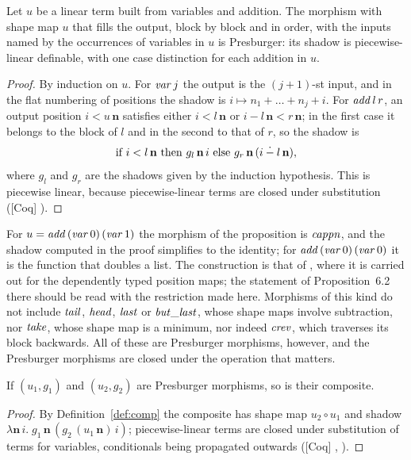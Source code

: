 \documentclass{fundam}
\begin{document}
\begin{proposition}\label{prop:linear-pl}
  Let $u$ be a linear term built from variables and addition.  The morphism with shape
  map $u$ that fills the output, block by block and in order, with the inputs named by
  the occurrences of variables in $u$ is Presburger: its shadow is piecewise-linear
  definable, with one case distinction for each addition in $u$.
\end{proposition}

\begin{proof}
  By induction on $u$.  For $\mathit{var}\,j$ the output is the $(j+1)$-st input, and in the
  flat numbering of positions the shadow is $i \mapsto n_1 + \dots + n_j + i$.  For
  $\mathit{add}\,l\,r$, an output position $i < u\,\mathbf{n}$ satisfies either
  $i < l\,\mathbf{n}$ or $i - l\,\mathbf{n} < r\,\mathbf{n}$; in the first case it belongs
  to the block of $l$ and in the second to that of $r$, so the shadow is
  \[
    \text{if } i < l\,\mathbf{n} \text{ then } g_l\,\mathbf{n}\,i
    \text{ else } g_r\,\mathbf{n}\,(i \mathbin{\dot{-}} l\,\mathbf{n}),
  \]
  where $g_l$ and $g_r$ are the shadows given by the induction hypothesis.  This is
  piecewise linear, because piecewise-linear terms are closed under substitution
  (\textsf{[Coq]} ).
\end{proof}

For $u = \mathit{add}\,(\mathit{var}\,0)\,(\mathit{var}\,1)$ the morphism of the proposition is
$\mathit{cappn}$, and the shadow computed in the proof simplifies to the identity; for
$\mathit{add}\,(\mathit{var}\,0)\,(\mathit{var}\,0)$ it is the function that doubles a list.  The
construction is that of \cite[\S6.2.1]{Prince10}, where it is carried out for the
dependently typed position maps; the statement of Proposition~6.2 there should be read
with the restriction made here.  Morphisms of this kind do not include $\mathit{tail}$,
$\mathit{head}$, $\mathit{last}$ or $\mathit{but\_last}$, whose shape maps involve subtraction, nor
$\mathit{take}$, whose shape map is a minimum, nor indeed $\mathit{crev}$, which traverses its
block backwards.  All of these are Presburger morphisms, however, and the Presburger
morphisms are closed under the operation that matters.

\begin{proposition}\label{prop:closure}
  If $(u_1, g_1)$ and $(u_2, g_2)$ are Presburger morphisms, so is their composite.
\end{proposition}

\begin{proof}
  By Definition~\ref{def:comp} the composite has shape map $u_2 \circ u_1$ and shadow
  $\lambda \mathbf{n}\,i.\; g_1\,\mathbf{n}\,(g_2\,(u_1\,\mathbf{n})\,i)$; piecewise-linear
  terms are closed under substitution of terms for variables, conditionals being
  propagated outwards (\textsf{[Coq]} , ).
\end{proof}
\end{document}
